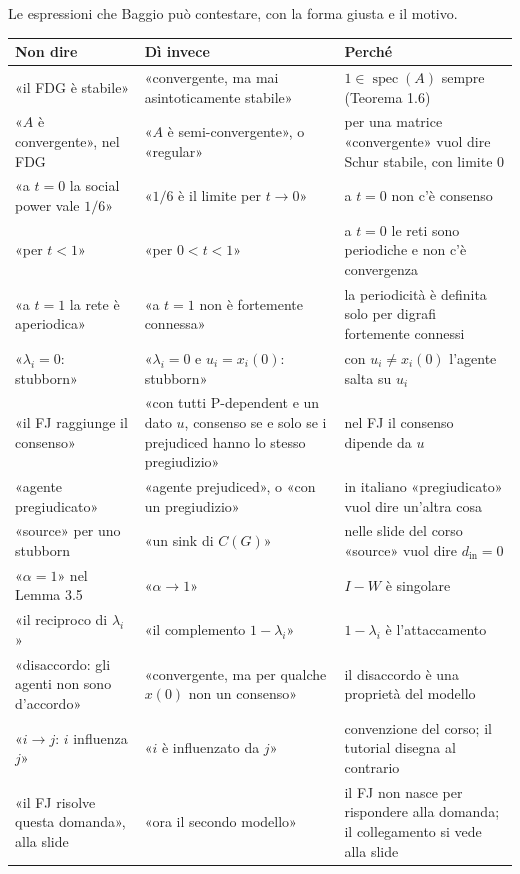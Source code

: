 \documentclass[a4paper,10pt]{article}
\newcommand{\fr}[1]{\getrefnumber{P-#1}}      %
\begin{document}
Le espressioni che Baggio può contestare, con la forma giusta e il motivo.

\smallskip
{\small
\begin{tabularx}{\textwidth}{>{\raggedright\arraybackslash}p{}>{\raggedright\arraybackslash}p{}>{\raggedright\arraybackslash}X}
  \toprule
  Non dire & Dì invece & Perché \\
  \midrule
  «il FDG è stabile» & «convergente, ma mai asintoticamente stabile» & $1\in\operatorname{spec}(A)$ sempre (Teorema 1.6) \\
  «$A$ è convergente», nel FDG & «$A$ è semi-convergente», o «regular» & per una matrice «convergente» vuol dire Schur stabile, con limite 0 \\
  «a $t=0$ la social power vale $1/6$» & «$1/6$ è il limite per $t\to0$» & a $t=0$ non c'è consenso \\
  «per $t<1$» & «per $0<t<1$» & a $t=0$ le reti sono periodiche e non c'è convergenza \\
  «a $t=1$ la rete è aperiodica» & «a $t=1$ non è fortemente connessa» & la periodicità è definita solo per digrafi fortemente connessi \\
  «$\lambda_i=0$: stubborn» & «$\lambda_i=0$ e $u_i=x_i(0)$: stubborn» & con $u_i\neq x_i(0)$ l'agente salta su $u_i$ \\
  «il FJ raggiunge il consenso» & «con tutti P-dependent e un dato $u$, consenso se e solo se i prejudiced hanno lo stesso pregiudizio» & nel FJ il consenso dipende da $u$ \\
  «agente pregiudicato» & «agente prejudiced», o «con un pregiudizio» & in italiano «pregiudicato» vuol dire un'altra cosa \\
  «source» per uno stubborn & «un sink di $C(G)$» & nelle slide del corso «source» vuol dire $d_{\mathrm{in}}=0$ \\
  «$\alpha=1$» nel Lemma 3.5 & «$\alpha\to1$» & $I-W$ è singolare \\
  «il reciproco di $\lambda_i$» & «il complemento $1-\lambda_i$» & $1-\lambda_i$ è l'attaccamento \\
  «disaccordo: gli agenti non sono d'accordo» & «convergente, ma per qualche $x(0)$ non un consenso» & il disaccordo è una proprietà del modello \\
  «$i\to j$: $i$ influenza $j$» & «$i$ è influenzato da $j$» & convenzione del corso; il tutorial disegna al contrario \\
  «il FJ risolve questa domanda», alla slide \fr{m-bridge} & «ora il secondo modello» & il FJ non nasce per rispondere alla domanda; il collegamento si vede alla slide \fr{m-back-question} \\
  \bottomrule
\end{tabularx}}
\end{document}
